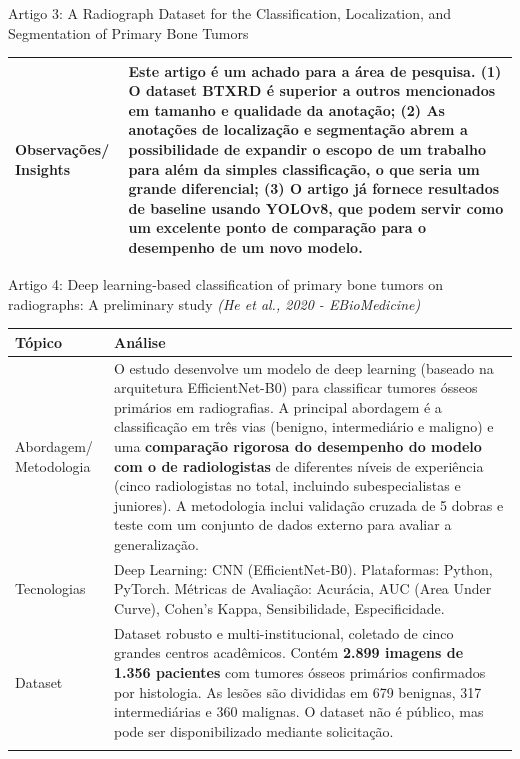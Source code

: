 \documentclass[12pt, a4paper]{article}
\begin{document}
\begin{fichabox}{{Artigo 3: A Radiograph Dataset for the Classification, Localization, and Segmentation of Primary Bone Tumors}}
\begin{longtable}{@{} B L{10.5cm} @{}}
    Observações/ Insights & \textbf{Este artigo é um achado para a área de pesquisa.} (1) O dataset \textbf{BTXRD} é superior a outros mencionados em tamanho e qualidade da anotação; (2) As anotações de localização e segmentação abrem a possibilidade de expandir o escopo de um trabalho para além da simples classificação, o que seria um grande diferencial; (3) O artigo já fornece resultados de baseline usando YOLOv8, que podem servir como um excelente ponto de comparação para o desempenho de um novo modelo. \\
    
    \bottomrule
\end{longtable}
\end{fichabox}

\begin{fichabox}{Artigo 4: Deep learning-based classification of primary bone tumors on radiographs: A preliminary study}
\textit{(He et al., 2020 - EBioMedicine)}

\begin{longtable}{@{} B L{10.5cm} @{}}
    \toprule
    \textbf{Tópico} & \textbf{Análise} \\
    \midrule
    \endhead 
    
    Abordagem/ Metodologia & O estudo desenvolve um modelo de deep learning (baseado na arquitetura EfficientNet-B0) para classificar tumores ósseos primários em radiografias. A principal abordagem é a classificação em três vias (benigno, intermediário e maligno) e uma \textbf{comparação rigorosa do desempenho do modelo com o de radiologistas} de diferentes níveis de experiência (cinco radiologistas no total, incluindo subespecialistas e juniores). A metodologia inclui validação cruzada de 5 dobras e teste com um conjunto de dados externo para avaliar a generalização. \\
    \addlinespace
    
    Tecnologias & Deep Learning: CNN (EfficientNet-B0). Plataformas: Python, PyTorch. Métricas de Avaliação: Acurácia, AUC (Area Under Curve), Cohen's Kappa, Sensibilidade, Especificidade. \\
    \addlinespace
    
    Dataset & Dataset robusto e multi-institucional, coletado de cinco grandes centros acadêmicos. Contém \textbf{2.899 imagens de 1.356 pacientes} com tumores ósseos primários confirmados por histologia. As lesões são divididas em 679 benignas, 317 intermediárias e 360 malignas. O dataset não é público, mas pode ser disponibilizado mediante solicitação. \\
    \addlinespace
    

\end{longtable}
\end{fichabox}
\end{document}
